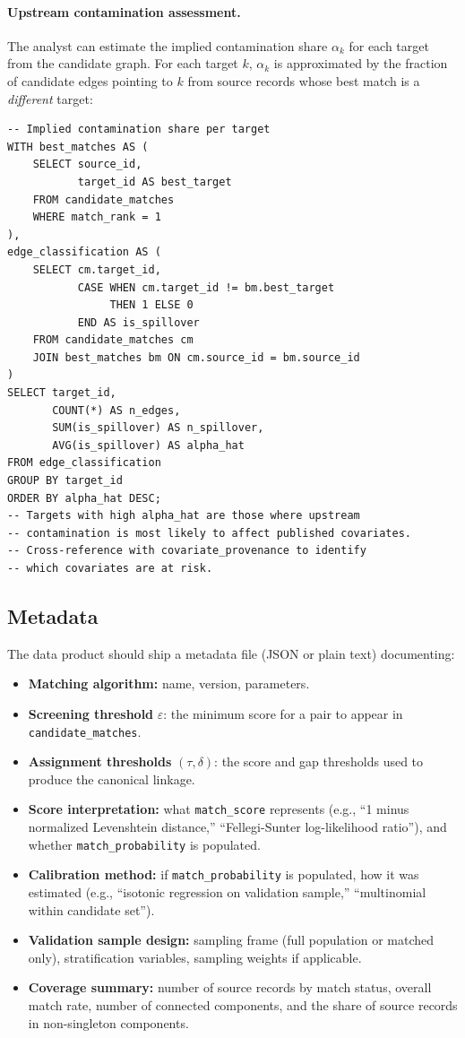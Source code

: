 \paragraph{Upstream contamination assessment.}

The analyst can estimate the implied contamination share $\alpha_k$ for each target from the candidate graph. For each target $k$, $\alpha_k$ is approximated by the fraction of candidate edges pointing to $k$ from source records whose best match is a \emph{different} target:

\begin{lstlisting}[style=sql]
-- Implied contamination share per target
WITH best_matches AS (
    SELECT source_id,
           target_id AS best_target
    FROM candidate_matches
    WHERE match_rank = 1
),
edge_classification AS (
    SELECT cm.target_id,
           CASE WHEN cm.target_id != bm.best_target
                THEN 1 ELSE 0
           END AS is_spillover
    FROM candidate_matches cm
    JOIN best_matches bm ON cm.source_id = bm.source_id
)
SELECT target_id,
       COUNT(*) AS n_edges,
       SUM(is_spillover) AS n_spillover,
       AVG(is_spillover) AS alpha_hat
FROM edge_classification
GROUP BY target_id
ORDER BY alpha_hat DESC;
-- Targets with high alpha_hat are those where upstream
-- contamination is most likely to affect published covariates.
-- Cross-reference with covariate_provenance to identify
-- which covariates are at risk.
\end{lstlisting}


\subsection{Metadata}

The data product should ship a metadata file (JSON or plain text) documenting:

\begin{itemize}
    \item \textbf{Matching algorithm:} name, version, parameters.
    \item \textbf{Screening threshold} $\varepsilon$: the minimum score for a pair to appear in \texttt{candidate\_matches}.
    \item \textbf{Assignment thresholds} $(\tau, \delta)$: the score and gap thresholds used to produce the canonical linkage.
    \item \textbf{Score interpretation:} what \texttt{match\_score} represents (e.g., ``1 minus normalized Levenshtein distance,'' ``Fellegi-Sunter log-likelihood ratio''), and whether \texttt{match\_probability} is populated.
    \item \textbf{Calibration method:} if \texttt{match\_probability} is populated, how it was estimated (e.g., ``isotonic regression on validation sample,'' ``multinomial within candidate set'').
    \item \textbf{Validation sample design:} sampling frame (full population or matched only), stratification variables, sampling weights if applicable.
    \item \textbf{Coverage summary:} number of source records by match status, overall match rate, number of connected components, and the share of source records in non-singleton components.
\end{itemize}